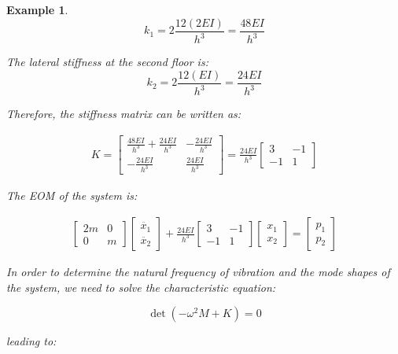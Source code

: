\documentclass[12pt,letter]{article}
\newtheorem{ex}{Example}
\numberwithin{ex}{section} %
\newenvironment{example}{\begin{mdframed}[middlelinewidth=0.5mm]\begin{ex}\normalfont}{\end{ex}\end{mdframed}}
\numberwithin{re}{section} %
\begin{document}
\begin{example}
\begin{equation}
k_1 = 2 \frac{12(2EI)}{h^3} = \frac{48EI}{h^3}
\end{equation}

\noindent The lateral stiffness at the second floor is:
\begin{equation}
k_2 = 2 \frac{12(EI)}{h^3} = \frac{24EI}{h^3}
\end{equation}

\noindent Therefore, the stiffness matrix can be written as:

\begin{eqnarray}
K= \begin{bmatrix} \frac{48EI}{h^3} + \frac{24EI}{h^3} & -\frac{24EI}{h^3}  \\  -\frac{24EI}{h^3} & \frac{24EI}{h^3} \end{bmatrix} = \frac{24EI}{h^3} \begin{bmatrix} 3 & -1  \\  -1 & 1 \end{bmatrix}
\end{eqnarray}		


The EOM of the system is:

\begin{eqnarray} 
\begin{bmatrix} 2m & 0  \\  0 & m \end{bmatrix}\begin{bmatrix} \ddot{x_1} \\  \ddot{x_2} \end{bmatrix} + \frac{24EI}{h^3} \begin{bmatrix} 3 & -1  \\  -1 & 1 \end{bmatrix}\begin{bmatrix} x_1 \\  x_2 \end{bmatrix}  = \begin{bmatrix} p_1 \\  p_2 \end{bmatrix}
\end{eqnarray}

In order to determine the natural frequency of vibration and the mode shapes of the system, we need to solve the characteristic equation:

\begin{equation}
\det(-\omega^2 M  + K) = 0
\end{equation}

\noindent leading to:


\end{example}
\end{document}
